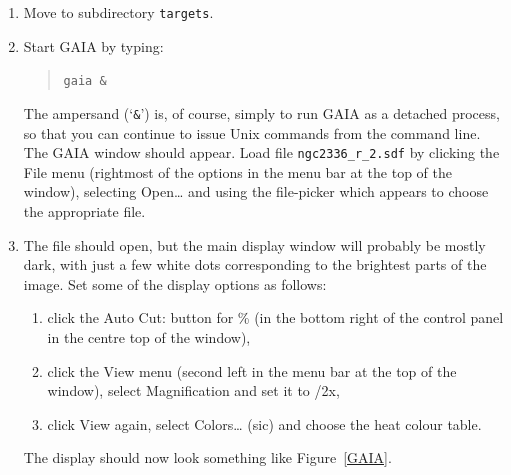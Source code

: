 \documentclass[twoside,11pt]{article}
\begin{document}
\begin{enumerate}

  \item Move to subdirectory {\tt targets}.

  \item Start GAIA by typing:

  \begin{quote}
   {\tt gaia \&}
  \end{quote}

   The ampersand (`{\tt \&}') is, of course, simply to run GAIA as a
   detached process, so that you can continue to issue Unix commands
   from the command line.  The GAIA window should appear.  Load file
   {\tt ngc2336\_r\_2.sdf} by clicking the {\sf File} menu (rightmost
   of the options in the menu bar at the top of the window), selecting
   {\sf Open\ldots} and using the file-picker which appears to choose
   the appropriate file.

  \item The file should open, but the main display window will probably
   be mostly dark, with just a few white dots corresponding to the
   brightest parts of the image.  Set some of the display options as
   follows:

  \begin{enumerate}

    \item click the {\sf Auto Cut:} button for {\%} (in the bottom
     right of the control panel in the centre top of the window),

    \item click the {\sf View} menu (second left in the menu bar at the
     top of the window), select {\sf Magnification} and set it to {/2x},

    \item click {\sf View} again, select {\sf Colors\ldots} (sic) and choose
     the {\sf heat} colour table.

  \end{enumerate}

   The display should now look something like Figure~\ref{GAIA}.


\end{enumerate}
\end{document}
